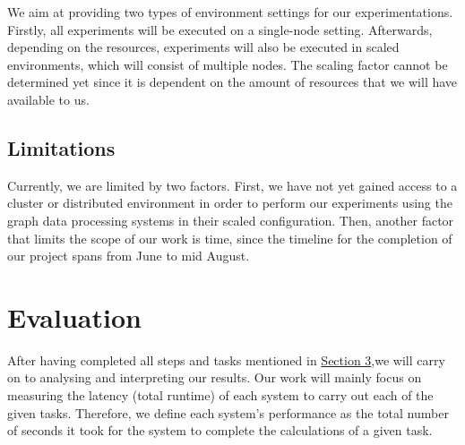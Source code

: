 \documentclass[a4paper,11pt]{article}
\begin{document}
\par We aim at providing two types of environment settings for our experimentations. Firstly, all experiments will be executed on a single-node setting. Afterwards, depending on the resources, experiments will also be executed in scaled environments, which will consist of multiple nodes. The scaling factor cannot be determined yet since it is dependent on the amount of resources that we will have available to us.

\subsection{Limitations} \label{limitations}

Currently, we are limited by two factors. First, we have not yet gained access to a cluster or distributed environment in order to perform our experiments using the graph data processing systems in their scaled configuration. Then, another factor that limits the scope of our work is time, since the timeline for the completion of our project spans from June to mid August.


\section{Evaluation} \label{evaluation}

\par After having completed all steps and tasks mentioned in \hyperref[methodology]{Section 3},we will carry on to analysing and interpreting our results. Our work will mainly focus on measuring the latency (total runtime) of each system to carry out each of the given tasks. Therefore, we define each system's performance as the total number of seconds it took for the system to complete the calculations of a given task.
\end{document}
